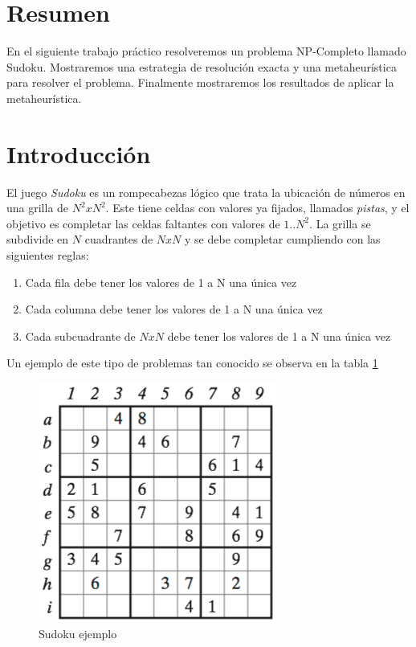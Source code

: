 \documentclass[a4paper,spanish]{article}
\begin{document}

\tableofcontents
\pagebreak


\section{Resumen}
En el siguiente trabajo práctico resolveremos un problema NP-Completo llamado
Sudoku. Mostraremos una estrategia de resolución exacta y una metaheurística
para resolver el problema. Finalmente mostraremos los resultados de aplicar la
metaheurística.


\section{Introducción}
\label{sec:intro}

El juego \emph{Sudoku} es un rompecabezas lógico que trata la ubicación de
números en una grilla de $N^2 x N^2$. Este tiene celdas con valores ya fijados,
llamados \textit{pistas}, y el objetivo es completar las celdas
faltantes con valores de $1..N^2$. La grilla se subdivide en $N$ cuadrantes de
$N x N$  y se debe completar cumpliendo con las siguientes reglas:

\begin{enumerate}
    \label{enum:principios}

    \item Cada fila debe tener los valores de 1 a N una única vez
    \item Cada columna debe tener los valores de 1 a N una única vez
    \item Cada subcuadrante de $NxN$ debe tener los valores de 1 a N una única vez
\end{enumerate}

Un ejemplo de este tipo de problemas tan conocido se observa en la tabla
\ref{img:sudoku}


\begin{figure}[H]
	\centering
	\includegraphics[scale=0.6]{./img/sudoku.png}
	\caption{Sudoku ejemplo}
	\label{img:sudoku}
\end{figure}
\end{document}
